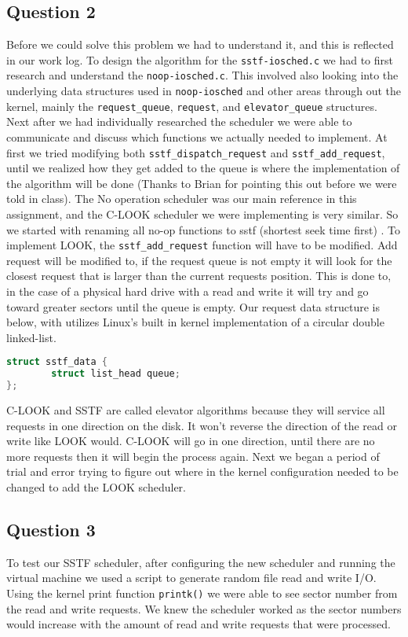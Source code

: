 \documentclass[10pt,draftclsnofoot,onecolumn, compsoc]{IEEEtran}
\begin{document}
\subsection{Question 2}
Before we could solve this problem we had to understand it, and this is reflected in our work log. To design the algorithm for the \texttt{sstf-iosched.c} we had to first research and understand the \texttt{noop-iosched.c}. This involved also looking into the underlying data structures used in \texttt{noop-iosched} and other areas through out the kernel, mainly the \texttt{request\_queue}, \texttt{request}, and \texttt{elevator\_queue} structures. Next after we had individually researched the scheduler we were able to communicate and discuss which functions we actually needed to implement. At first we tried modifying both \texttt{sstf\_dispatch\_request} and \texttt{sstf\_add\_request}, until we realized how they get added to the queue is where the implementation of the algorithm will be done (Thanks to Brian for pointing this out before we were told in class). The No operation scheduler was our main reference in this assignment, and the C-LOOK scheduler we were implementing is very similar. So we started with renaming all no-op functions to sstf (shortest seek time first) \cite{celis_gonzales_2014}. To implement LOOK, the \texttt{sstf\_add\_request} function will have to be modified. Add request will be modified to, if the request queue is not empty it will look for the closest request that is larger than the current requests position. This is done to, in the case of a physical hard drive with a read and write it will try and go toward greater sectors until the queue is empty. Our request data structure is below, with utilizes Linux's built in kernel implementation of a circular double linked-list.
\begin{lstlisting}[language=C, style=customc]
struct sstf_data {
        struct list_head queue;
};
\end{lstlisting}
C-LOOK and SSTF are called elevator algorithms because they will service all requests in one direction on the disk. It won't reverse the direction of the read or write like LOOK would. C-LOOK will go in one direction, until there are no more requests then it will begin the process again.
Next we began a period of trial and error trying to figure out where in the kernel configuration needed to be changed to add the LOOK scheduler.
\subsection{Question 3}
To test our SSTF scheduler, after configuring the new scheduler and running the virtual machine we used a script to generate random file read and write I/O. Using the kernel print function \texttt{printk()} we were able to see sector number from the read and write requests. We knew the scheduler worked as the sector numbers would increase with the amount of read and write requests that were processed.
\end{document}
